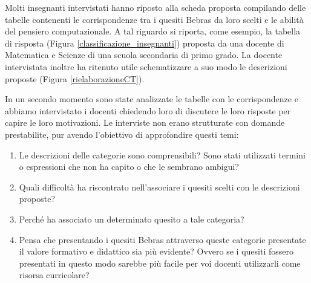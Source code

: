 \documentclass[12pt]{report}
\begin{document}
\bigskip
Molti insegnanti intervistati hanno riposto alla scheda proposta compilando delle tabelle contenenti le corrispondenze tra i quesiti Bebras da loro scelti e le abilità del pensiero computazionale. A tal riguardo si riporta, come esempio, la tabella di risposta (Figura \ref{classificazione_insegnanti}) proposta da una docente di Matematica e Scienze di una scuola secondaria di primo grado. La docente intervistata inoltre ha ritenuto utile schematizzare a suo modo le descrizioni proposte (Figura \ref{rielaborazioneCT}).


In un secondo momento sono state analizzate le tabelle con le corrispondenze e abbiamo intervistato i docenti chiedendo loro di discutere le loro risposte per capire le loro motivazioni. Le interviste non erano strutturate con domande prestabilite, pur avendo l'obiettivo di approfondire questi temi:

\begin{enumerate}[label=(\arabic*)]
	\item Le descrizioni delle categorie sono comprensibili? Sono stati utilizzati termini o espressioni che non ha capito o che le sembrano ambigui? 
	
	\item Quali difficoltà ha riscontrato nell'associare i quesiti scelti con le descrizioni proposte?
	
	\item Perché ha associato un determinato quesito a tale categoria?
	
	\item Pensa che presentando i quesiti Bebras attraverso queste categorie presentate il valore formativo e didattico sia più evidente? Ovvero se i quesiti fossero presentati in questo modo sarebbe più facile per voi docenti utilizzarli come risorsa curricolare?
\end{enumerate}
\end{document}
